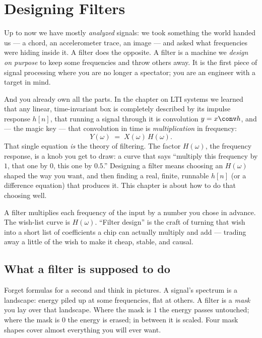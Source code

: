 \chapter{Designing Filters}

Up to now we have mostly \emph{analyzed} signals: we took something the world
handed us --- a chord, an accelerometer trace, an image --- and asked what
frequencies were hiding inside it. A filter does the opposite. A filter is a
machine we \emph{design on purpose} to keep some frequencies and throw others
away. It is the first piece of signal processing where you are no longer a
spectator; you are an engineer with a target in mind.

And you already own all the parts. In the chapter on LTI systems we learned that
any linear, time-invariant box is completely described by its impulse response
$h[n]$, that running a signal through it is convolution $y = x \conv h$, and ---
the magic key --- that convolution in time is \emph{multiplication} in frequency:
\[
Y(\omega) \;=\; X(\omega)\, H(\omega).
\]
That single equation \emph{is} the theory of filtering. The factor $H(\omega)$,
the frequency response, is a knob you get to draw: a curve that says ``multiply
this frequency by $1$, that one by $0$, this one by $0.5$.'' Designing a filter
means choosing an $H(\omega)$ shaped the way you want, and then finding a real,
finite, runnable $h[n]$ (or a difference equation) that produces it. This chapter
is about how to do that choosing well.

\begin{focusbox}
A filter multiplies each frequency of the input by a number you chose in advance.
The wish-list curve is $H(\omega)$. ``Filter design'' is the craft of turning that
wish into a short list of coefficients a chip can actually multiply and add ---
trading away a little of the wish to make it cheap, stable, and causal.
\end{focusbox}

\section{What a filter is supposed to do}
\label{ch16:what}

Forget formulas for a second and think in pictures. A signal's spectrum is a
landscape: energy piled up at some frequencies, flat at others. A filter is a
\emph{mask} you lay over that landscape. Where the mask is $1$ the energy passes
untouched; where the mask is $0$ the energy is erased; in between it is scaled.
Four mask shapes cover almost everything you will ever want.

